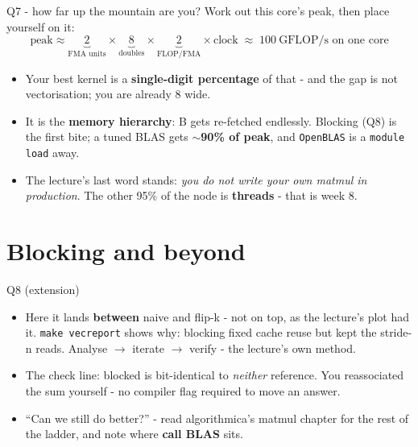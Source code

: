 \documentclass[aspectratio=169]{beamer}
\newcommand{\cplx}[1]{{\footnotesize\color{cookieMuted}#1}}
\begin{document}
\begin{frame}{Q7 - how far up the mountain are you?}
  Work out this core's peak, then place yourself on it:
  \[
    \text{peak} \approx
    \underbrace{2}_{\text{FMA units}} \times
    \underbrace{8}_{\text{doubles}} \times
    \underbrace{2}_{\text{FLOP/FMA}} \times
    \text{clock} \;\approx\; 100\ \text{GFLOP/s on one core}
  \]
  \pause
  \begin{itemize}\setlength\itemsep{5pt}
    \item Your best kernel is a \textbf{single-digit percentage} of that -
      and the gap is not vectorisation; you are already 8 wide.
    \item It is the \textbf{memory hierarchy}: B gets re-fetched endlessly.
      Blocking (Q8) is the first bite; a tuned BLAS gets \textbf{$\sim$90\% of
      peak}, and \texttt{OpenBLAS} is a \texttt{module load} away.
    \item The lecture's last word stands: \emph{you do not write your own
      matmul in production}. The other 95\% of the node is \textbf{threads} -
      that is week 8.
  \end{itemize}
\end{frame}

\section{Blocking and beyond}

\begin{frame}[fragile]{Q8 (extension)}
  \medskip
  \begin{itemize}\setlength\itemsep{5pt}
    \item Here it lands \textbf{between} naive and flip-k - not on top, as
      the lecture's plot had it. \texttt{make vecreport} shows why: blocking
      fixed cache reuse but kept the stride-n reads.
      \cplx{Analyse $\to$ iterate $\to$ verify - the lecture's own method.}
    \item The check line: blocked is bit-identical to \emph{neither}
      reference. You reassociated the sum yourself - no compiler flag
      required to move an answer.
    \item ``Can we still do better?'' - read algorithmica's matmul chapter
      for the rest of the ladder, and note where \textbf{call BLAS} sits.
  \end{itemize}
\end{frame}
\end{document}
